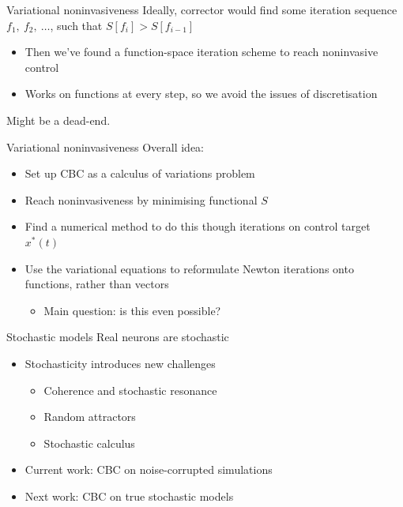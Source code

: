 \documentclass[presentation]{beamer}
\begin{document}
\begin{frame}[label={sec:org8a12d41}]{Variational noninvasiveness}
Ideally, corrector would find some iteration sequence \(f_1,~f_2,~\dots\), such that \(S[f_i] > S[f_{i-1}]\)
\begin{itemize}
\item Then we've found a function-space iteration scheme to reach noninvasive control
\item Works on functions at every step, so we avoid the issues of discretisation
\end{itemize}
\vfill
Might be a dead-end.
\end{frame}

\begin{frame}[label={sec:org3f46807}]{Variational noninvasiveness}
Overall idea:
\begin{itemize}
\item Set up CBC as a calculus of variations problem
\item Reach noninvasiveness by minimising functional \(S\)
\item Find a numerical method to do this though iterations on control target \(x^*(t)\)
\item Use the variational equations to reformulate Newton iterations onto functions, rather than vectors
\begin{itemize}
\item Main question: is this even possible?
\end{itemize}
\end{itemize}
\end{frame}

\begin{frame}[label={sec:orge1f8045}]{Stochastic models}
Real neurons are stochastic
\begin{itemize}
\item Stochasticity introduces new challenges
\begin{itemize}
\item Coherence and stochastic resonance
\item Random attractors
\item Stochastic calculus
\end{itemize}
\item Current work: CBC on noise-corrupted simulations
\item Next work: CBC on true stochastic models
\end{itemize}

\vfill
\end{frame}
\end{document}
